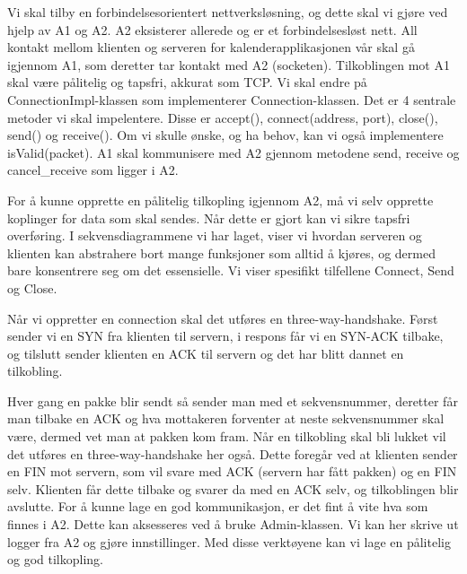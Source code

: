 Vi skal tilby en forbindelsesorientert nettverksløsning, og dette skal vi gjøre ved hjelp av A1 og A2. A2 eksisterer allerede og er et forbindelsesløst nett. All kontakt mellom klienten og serveren for kalenderapplikasjonen vår skal gå igjennom A1, som deretter tar kontakt med A2 (socketen). Tilkoblingen mot A1 skal være pålitelig og tapsfri, akkurat som TCP. Vi skal endre på ConnectionImpl-klassen som implementerer Connection-klassen. Det er 4 sentrale metoder vi skal impelentere. Disse er accept(), connect(address, port), close(), send() og receive(). Om vi skulle ønske, og ha behov, kan vi også implementere isValid(packet). A1 skal kommunisere med A2 gjennom metodene send, receive og cancel\_receive som ligger i A2.

For å kunne opprette en pålitelig tilkopling igjennom A2, må vi selv opprette koplinger for data som skal sendes. Når dette er gjort kan vi sikre tapsfri overføring. I sekvensdiagrammene vi har laget, viser vi hvordan serveren og klienten kan abstrahere bort mange funksjoner som alltid å kjøres, og dermed bare konsentrere seg om det essensielle. Vi viser spesifikt tilfellene Connect, Send og Close.

Når vi oppretter en connection skal det utføres en three-way-handshake. Først sender vi en SYN fra klienten til servern, i respons får vi en SYN-ACK tilbake, og tilslutt sender klienten en ACK til servern og det har blitt dannet en tilkobling.

Hver gang en pakke blir sendt så sender man med et sekvensnummer, deretter får man tilbake en ACK og hva mottakeren forventer at neste sekvensnummer skal være, dermed vet man at pakken kom fram. 
Når en tilkobling skal bli lukket vil det utføres en three-way-handshake her også. Dette foregår ved at klienten sender en FIN mot servern, som vil svare med ACK (servern har fått pakken) og en FIN selv. Klienten får dette tilbake og svarer da med en ACK selv, og tilkoblingen blir avslutte.
For å kunne lage en god kommunikasjon, er det fint å vite hva som finnes i A2. Dette kan aksesseres ved å bruke Admin-klassen. Vi kan her skrive ut logger fra A2 og gjøre innstillinger. Med disse verktøyene kan vi lage en pålitelig og god tilkopling.